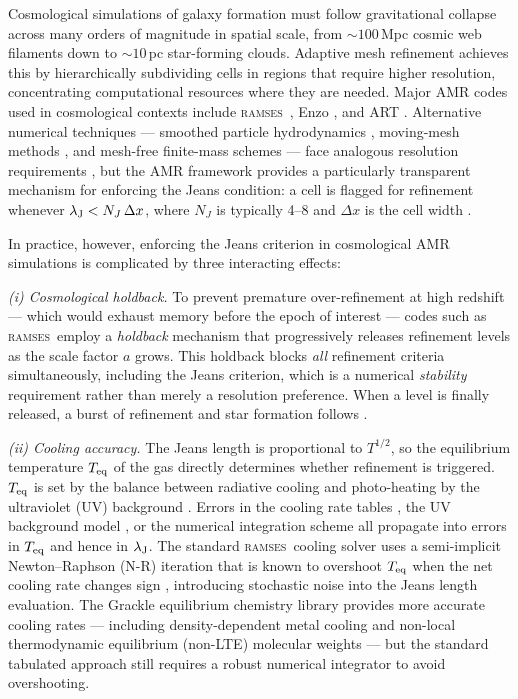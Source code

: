 \documentclass[fleqn,usenatbib]{mnras}
\newcommand{\lJ}{\lambda_{\rm J}}
\newcommand{\dx}{\Delta x}
\newcommand{\ramses}{\textsc{ramses}}
\begin{document}
Cosmological simulations of galaxy formation must follow
gravitational collapse across many orders of magnitude in spatial
scale, from $\sim 100\,$Mpc cosmic web filaments down to
$\sim 10\,$pc star-forming clouds.  Adaptive mesh refinement
\citep[AMR;][]{Berger1984, Berger1989} achieves this by
hierarchically subdividing cells in regions that require higher
resolution, concentrating computational resources where they are
needed.  Major AMR codes used in cosmological contexts include
\ramses\ \citep{Teyssier2002}, Enzo \citep{Bryan2014}, and ART
\citep{Kravtsov1997}.  Alternative numerical techniques --- smoothed
particle hydrodynamics \citep[SPH;][]{Springel2005}, moving-mesh
methods \citep{Springel2010}, and mesh-free finite-mass schemes
\citep{Hopkins2015} --- face analogous resolution requirements
\citep{Bate1997, Nelson2009}, but the AMR framework provides a
particularly transparent mechanism for enforcing the Jeans condition:
a cell is flagged for refinement whenever $\lJ < N_J\,\dx$, where
$N_J$ is typically 4--8 and $\dx$ is the cell width
\citep{Truelove1997}.

In practice, however, enforcing the Jeans criterion in cosmological
AMR simulations is complicated by three interacting effects:

\textit{(i) Cosmological holdback.}  To prevent premature
over-refinement at high redshift --- which would exhaust memory
before the epoch of interest --- codes such as \ramses\ employ a
\emph{holdback} mechanism that progressively releases refinement
levels as the scale factor $a$ grows.  This holdback blocks
\emph{all} refinement criteria simultaneously, including the Jeans
criterion, which is a numerical \emph{stability} requirement rather
than merely a resolution preference.  When a level is finally
released, a burst of refinement and star formation follows
\citep[see also][]{Dubois2014, Dubois2021}.

\textit{(ii) Cooling accuracy.}  The Jeans length is proportional to
$T^{1/2}$, so the equilibrium temperature $T_{\rm eq}$ of the gas
directly determines whether refinement is triggered.  $T_{\rm eq}$ is
set by the balance between radiative cooling and photo-heating by the
ultraviolet (UV) background \citep{HM2012, FG2020}.  Errors in the
cooling rate tables \citep{Sutherland1993, Ferland2017}, the UV
background model \citep{Courty2004}, or the numerical integration
scheme all propagate into errors in $T_{\rm eq}$ and hence in $\lJ$.
The standard \ramses\ cooling solver uses a semi-implicit
Newton--Raphson (N-R) iteration that is known to overshoot $T_{\rm eq}$
when the net cooling rate changes sign
\citep[cf.][]{Townsend2009}, introducing stochastic noise into the
Jeans length evaluation.  The Grackle equilibrium chemistry library
\citep{Smith2017} provides more accurate cooling rates --- including
density-dependent metal cooling and non-local thermodynamic
equilibrium (non-LTE) molecular weights --- but the standard tabulated
approach still requires a robust numerical integrator to avoid
overshooting.
\end{document}

